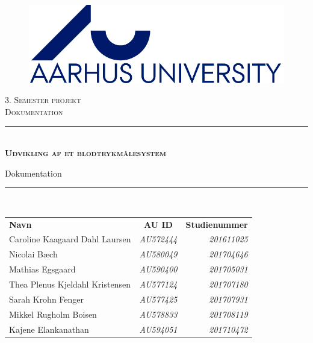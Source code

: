 \thispagestyle{empty}
\newcommand{\HRule}{\rule{\linewidth}{0.1mm}} %

\begin{center}
	\vspace{5cm}
	
	\begin{figure}[h!]
		\centering
		\includegraphics[width=0.5\linewidth]{Forside/AUlogo}
	\end{figure}
	
	\vspace{0.1 in}
	
	\textsc{\large 3. Semester projekt \\Dokumentation}\\[1.5cm] 
	
	\HRule \\[0.8cm]
	{\huge \bfseries \textsc{Udvikling af et blodtrykmålesystem}} 
	
	{\LARGE Dokumentation} \\[0.4cm]
	\HRule \\[1.5cm]
	
	
	
	
	\vspace{0.2 in}
	\begin{center}
		\begin{tabular}{l c r}
			\textbf{Navn} & \textbf{AU ID} & \textbf{Studienummer} \\
			Caroline Kaagaard Dahl Laursen & \textsl{AU572444} & \textsl{201611025}  \\
			Nicolai Bæch & \textsl{AU580049} & \textsl{201704646}  \\
			Mathias Egsgaard & \textsl{AU590400} & \textsl{201705031}  \\
			Thea Plenus Kjeldahl Kristensen & \textsl{AU577124} & \textsl{201707180}  \\
			Sarah Krohn Fenger & \textsl{AU577425} & \textsl{201707931}  \\
			Mikkel Rugholm Boisen & \textsl{AU578833} & \textsl{201708119}  \\
			Kajene Elankanathan & \textsl{AU594051} & \textsl{201710472}  \\
			

\end{tabular}
\end{center}
\end{center}
